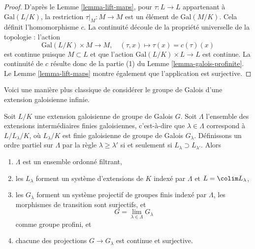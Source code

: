 \begin{proof}
D'après le Lemme \ref{lemma-lift-maps}, pour $\tau : L \to L$ appartenant à
$\text{Gal}(L/K)$, la restriction $\tau|_M : M \to M$
est un élément de $\text{Gal}(M/K)$. Cela définit l'homomorphisme $c$.
La continuité découle de la propriété universelle de la topologie :
l'action
$$
\text{Gal}(L/K) \times M \longrightarrow M,\quad
(\tau, x) \longmapsto \tau(x) = c(\tau)(x)
$$
est continue puisque $M \subset L$ et que l'action
$\text{Gal}(L/K) \times L \to L$ est continue.
La continuité de $c$ résulte donc de la partie (1) du
Lemme \ref{lemma-galois-profinite}.
Le Lemme \ref{lemma-lift-maps} montre également
que l'application est surjective.
\end{proof}

\noindent
Voici une manière plus classique de considérer
le groupe de Galois d'une extension galoisienne infinie.

\begin{lemma}
\label{lemma-infinite-galois-limit}
Soit $L/K$ une extension galoisienne de groupe de Galois $G$.
Soit $\Lambda$ l'ensemble des extensions intermédiaires finies galoisiennes,
c'est-à-dire que $\lambda \in \Lambda$ correspond à $L/L_\lambda/K$,
où $L_\lambda/K$ est finie galoisienne de groupe de Galois $G_\lambda$.
Définissons un ordre partiel sur $\Lambda$ par la règle
$\lambda \geq \lambda'$ si et seulement si
$L_\lambda \supset L_{\lambda'}$. Alors
\begin{enumerate}
\item $\Lambda$ est un ensemble ordonné filtrant,
\item les $L_\lambda$ forment un système d'extensions de $K$ indexé par $\Lambda$
et $L = \colim L_\lambda$,
\item les $G_\lambda$ forment un système projectif de groupes finis indexé par $\Lambda$,
les morphismes de transition sont surjectifs, et
$$
G = \lim_{\lambda \in \Lambda} G_\lambda
$$
comme groupe profini, et
\item chacune des projections $G \to G_\lambda$ est continue et surjective.
\end{enumerate}
\end{lemma}

